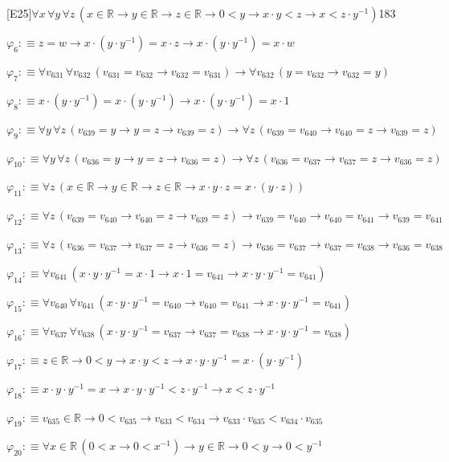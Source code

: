 \begin{fullproof}{[E25]}{$\forall x\,\forall y\,\forall z\,(x \in \mathbb{R} \to y \in \mathbb{R} \to z \in \mathbb{R} \to 0 < y \to x \cdot y < z \to x < z \cdot y^{-1})$}{183}
\begin{abbrevlist}
\item $\varphi_{6} :\equiv z = w \to x \cdot (y \cdot y^{-1}) = x \cdot z \to x \cdot (y \cdot y^{-1}) = x \cdot w$
\item $\varphi_{7} :\equiv \forall v_{631}\,\forall v_{632}\,(v_{631} = v_{632} \to v_{632} = v_{631}) \to \forall v_{632}\,(y = v_{632} \to v_{632} = y)$
\item $\varphi_{8} :\equiv x \cdot (y \cdot y^{-1}) = x \cdot (y \cdot y^{-1}) \to x \cdot (y \cdot y^{-1}) = x \cdot 1$
\item $\varphi_{9} :\equiv \forall y\,\forall z\,(v_{639} = y \to y = z \to v_{639} = z) \to \forall z\,(v_{639} = v_{640} \to v_{640} = z \to v_{639} = z)$
\item $\varphi_{10} :\equiv \forall y\,\forall z\,(v_{636} = y \to y = z \to v_{636} = z) \to \forall z\,(v_{636} = v_{637} \to v_{637} = z \to v_{636} = z)$
\item $\varphi_{11} :\equiv \forall z\,(x \in \mathbb{R} \to y \in \mathbb{R} \to z \in \mathbb{R} \to x \cdot y \cdot z = x \cdot (y \cdot z))$
\item $\varphi_{12} :\equiv \forall z\,(v_{639} = v_{640} \to v_{640} = z \to v_{639} = z) \to v_{639} = v_{640} \to v_{640} = v_{641} \to v_{639} = v_{641}$
\item $\varphi_{13} :\equiv \forall z\,(v_{636} = v_{637} \to v_{637} = z \to v_{636} = z) \to v_{636} = v_{637} \to v_{637} = v_{638} \to v_{636} = v_{638}$
\item $\varphi_{14} :\equiv \forall v_{641}\,(x \cdot y \cdot y^{-1} = x \cdot 1 \to x \cdot 1 = v_{641} \to x \cdot y \cdot y^{-1} = v_{641})$
\item $\varphi_{15} :\equiv \forall v_{640}\,\forall v_{641}\,(x \cdot y \cdot y^{-1} = v_{640} \to v_{640} = v_{641} \to x \cdot y \cdot y^{-1} = v_{641})$
\item $\varphi_{16} :\equiv \forall v_{637}\,\forall v_{638}\,(x \cdot y \cdot y^{-1} = v_{637} \to v_{637} = v_{638} \to x \cdot y \cdot y^{-1} = v_{638})$
\item $\varphi_{17} :\equiv z \in \mathbb{R} \to 0 < y \to x \cdot y < z \to x \cdot y \cdot y^{-1} = x \cdot (y \cdot y^{-1})$
\item $\varphi_{18} :\equiv x \cdot y \cdot y^{-1} = x \to x \cdot y \cdot y^{-1} < z \cdot y^{-1} \to x < z \cdot y^{-1}$
\item $\varphi_{19} :\equiv v_{635} \in \mathbb{R} \to 0 < v_{635} \to v_{633} < v_{634} \to v_{633} \cdot v_{635} < v_{634} \cdot v_{635}$
\item $\varphi_{20} :\equiv \forall x \in \mathbb{R}\,(0 < x \to 0 < x^{-1}) \to y \in \mathbb{R} \to 0 < y \to 0 < y^{-1}$

\end{abbrevlist}
\end{fullproof}
